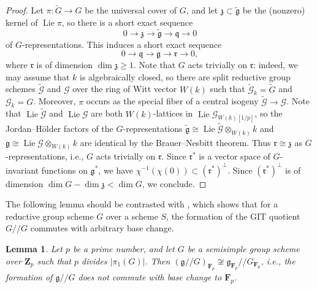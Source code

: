 \documentclass[11pt,reqno]{amsart}
\newtheorem{lemma}[theorem]{Lemma}
\theoremstyle{definition}
\newcommand{\bF}{{\mathbf F}}
\newcommand{\bZ}{{\mathbf Z}}
\newcommand{\cG}{\mathcal{G}}
\newcommand{\fg}{\mathfrak{g}}
\newcommand{\fq}{\mathfrak{q}}
\newcommand{\fr}{\mathfrak{r}}
\newcommand{\fz}{\mathfrak{z}}
\DeclareMathOperator{\Lie}{Lie}
\begin{document}
\begin{proof}
    Let $\pi\colon \widetilde{G} \to G$ be the universal cover of $G$, and let $\fz \subset \widetilde{\fg}$ be the (nonzero) kernel of $\Lie \pi$, so there is a short exact sequence
    \[
    0 \to \fz \to \widetilde{\fg} \to \fq \to 0
    \]
    of $G$-representations. This induces a short exact sequence
    \[
    0 \to \fq \to \fg \to \fr \to 0,
    \]
    where $\fr$ is of dimension $\dim \fz \geq 1$. Note that $G$ acts trivially on $\fr$: indeed, we may assume that $k$ is algebraically closed, so there are split reductive group schemes $\widetilde{\cG}$ and $\cG$ over the ring of Witt vector $W(k)$ such that $\widetilde{\cG}_k = \widetilde{G}$ and $\cG_k = G$. Moreover, $\pi$ occurs as the special fiber of a central isogeny $\widetilde{\cG} \to \cG$. Note that $\Lie \widetilde{\cG}$ and $\Lie \cG$ are both $W(k)$-lattices in $\Lie \cG_{W(k)[1/p]}$, so the Jordan--H\"older factors of the $G$-representations $\widetilde{\fg} \cong \Lie \widetilde{\cG} \otimes_{W(k)} k$ and $\fg \cong \Lie \cG \otimes_{W(k)} k$ are identical by the Brauer--Nesbitt theorem. Thus $\fr \cong \fz$ as $G$-representations, i.e., $G$ acts trivially on $\fr$. Since $\fr^*$ is a vector space of $G$-invariant functions on $\fg^*$, we have $\chi^{-1}(\chi(0)) \subset (\fr^*)^\perp$. Since $(\fr^*)^\perp$ is of dimension $\dim G - \dim \fz < \dim G$, we conclude.
\end{proof}

The following lemma should be contrasted with \cite[Theorem 4.1(1)]{Lee-adjoint}, which shows that for a reductive group scheme $G$ over a scheme $S$, the formation of the GIT quotient $G/\!/G$ commutes with arbitrary base change.

\begin{lemma}\label{lemma:nilp-scheme-base-change}
    Let $p$ be a prime number, and let $G$ be a semisimple group scheme over $\bZ_p$ such that $p$ divides $|\pi_1(G)|$. Then $(\fg/\!/G)_{\bF_p} \not\cong \fg_{\bF_p}/\!/G_{\bF_p}$, i.e., the formation of $\fg/\!/G$ does not commute with base change to $\bF_p$.
\end{lemma}
\end{document}
